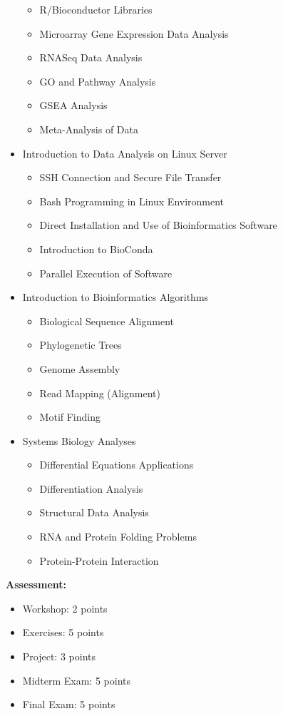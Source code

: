\documentclass[12pt]{article}
\begin{document}
\begin{itemize}
\begin{itemize}
        \item R/Bioconductor Libraries
        \item Microarray Gene Expression Data Analysis
        \item RNASeq Data Analysis
        \item GO and Pathway Analysis
        \item GSEA Analysis
        \item Meta-Analysis of Data
    \end{itemize}
    \item Introduction to Data Analysis on Linux Server
    \begin{itemize}
        \item SSH Connection and Secure File Transfer
        \item Bash Programming in Linux Environment
        \item Direct Installation and Use of Bioinformatics Software
        \item Introduction to BioConda
        \item Parallel Execution of Software
    \end{itemize}
    \item Introduction to Bioinformatics Algorithms
    \begin{itemize}
        \item Biological Sequence Alignment
        \item Phylogenetic Trees
        \item Genome Assembly
        \item Read Mapping (Alignment)
        \item Motif Finding
    \end{itemize}
    \item Systems Biology Analyses
    \begin{itemize}
        \item Differential Equations Applications
        \item Differentiation Analysis
        \item Structural Data Analysis
        \item RNA and Protein Folding Problems
        \item Protein-Protein Interaction
    \end{itemize}
\end{itemize}

\textbf{Assessment:}
\begin{itemize}
    \item Workshop: 2 points
    \item Exercises: 5 points
    \item Project: 3 points
    \item Midterm Exam: 5 points
    \item Final Exam: 5 points
\end{itemize}
\end{document}
